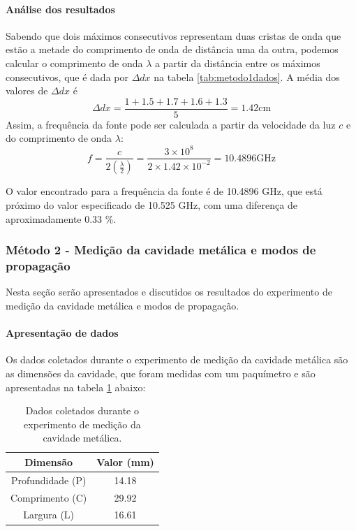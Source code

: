 \documentclass[12pt]{article}
\begin{document}
\paragraph{Análise dos resultados}
Sabendo que dois máximos consecutivos representam duas cristas de onda que estão
a metade do comprimento de onda de distância uma da outra, podemos
calcular o comprimento de onda $\lambda$ a partir da distância entre
os máximos consecutivos, que é dada por $\Delta dx$ na tabela
\ref{tab:metodo1dados}. A média dos valores de $\Delta dx$ é
\begin{equation}
  \Delta dx = \frac{1 + 1.5 + 1.7 + 1.6 + 1.3}{5} = 1.42 \text{cm}
\end{equation}
Assim, a frequência da fonte pode ser calculada a partir da
velocidade da luz $c$ e do comprimento de onda $\lambda$:
\begin{equation}
  f = \frac{c}{2(\frac{\lambda}{2})} = \frac{3 \times 10^8 }{2 \times
  1.42 \times 10^{-2}} = 10.4896 \text{GHz}
\end{equation}

O valor encontrado para a frequência da fonte é de 10.4896 GHz, que
está próximo do valor especificado de 10.525 GHz, com uma diferença
de aproximadamente
0.33 \%.

\subsubsection{Método 2 - Medição da cavidade metálica e modos de propagação}
Nesta seção serão apresentados e discutidos os resultados do experimento de
medição da cavidade metálica e modos de propagação.
\paragraph{Apresentação de dados}
Os dados coletados durante o experimento de medição da cavidade
metálica são as dimensões da cavidade, que foram medidas com um
paquímetro e são apresentadas na tabela \ref{tab:metodo2dados} abaixo:
\begin{table}[H]
  \centering
  \begin{tabular}{|c|c|}
    \hline
    Dimensão & Valor (mm) \\
    \hline
    Profundidade (P) & 14.18 \\
    Comprimento (C) & 29.92 \\
    Largura (L) & 16.61 \\
    \hline
  \end{tabular}
  \caption{Dados coletados durante o experimento de medição da
  cavidade metálica.}
  \label{tab:metodo2dados}
\end{table}
\end{document}
